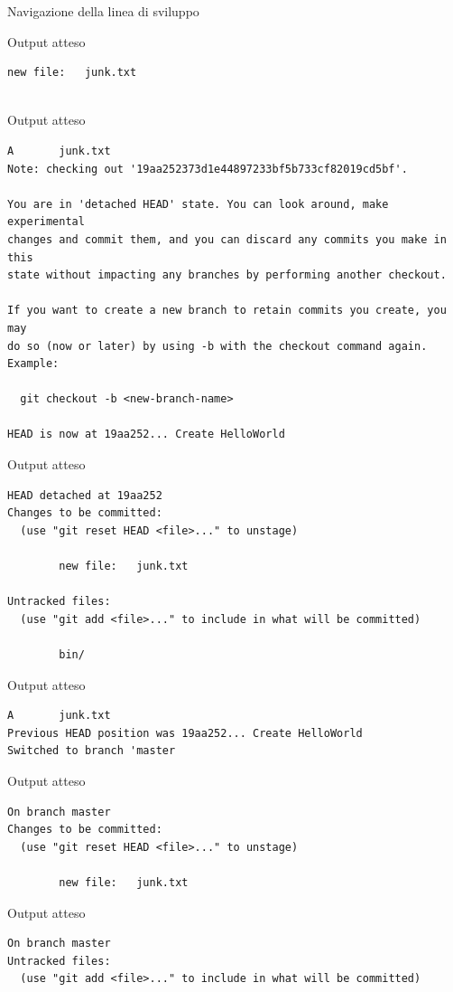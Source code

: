 \documentclass[xcolor=dvipsnames,presentation]{beamer}
\begin{document}
\begin{frame}{Navigazione della linea di sviluppo}
\begin{block}{Output atteso}
\begin{Verbatim}[fontsize=\scriptsize]
        new file:   junk.txt


        \end{Verbatim}
    \end{block}
    \begin{block}{Output atteso}
        \begin{Verbatim}[fontsize=\scriptsize]
A       junk.txt
Note: checking out '19aa252373d1e44897233bf5b733cf82019cd5bf'.

You are in 'detached HEAD' state. You can look around, make experimental
changes and commit them, and you can discard any commits you make in this
state without impacting any branches by performing another checkout.

If you want to create a new branch to retain commits you create, you may
do so (now or later) by using -b with the checkout command again. Example:

  git checkout -b <new-branch-name>

HEAD is now at 19aa252... Create HelloWorld
        \end{Verbatim}
    \end{block}
    \begin{block}{Output atteso}
        \begin{Verbatim}[fontsize=\scriptsize]
HEAD detached at 19aa252
Changes to be committed:
  (use "git reset HEAD <file>..." to unstage)

        new file:   junk.txt

Untracked files:
  (use "git add <file>..." to include in what will be committed)

        bin/

        \end{Verbatim}
    \end{block}
    \begin{block}{Output atteso}
        \begin{Verbatim}[fontsize=\scriptsize]
A       junk.txt
Previous HEAD position was 19aa252... Create HelloWorld
Switched to branch 'master
        \end{Verbatim}
    \end{block}
    \begin{block}{Output atteso}
        \begin{Verbatim}[fontsize=\scriptsize]
On branch master
Changes to be committed:
  (use "git reset HEAD <file>..." to unstage)

        new file:   junk.txt

        \end{Verbatim}
    \end{block}
    \begin{block}{Output atteso}
        \begin{Verbatim}[fontsize=\scriptsize]
On branch master
Untracked files:
  (use "git add <file>..." to include in what will be committed)


\end{Verbatim}
\end{block}
\end{frame}
\end{document}
